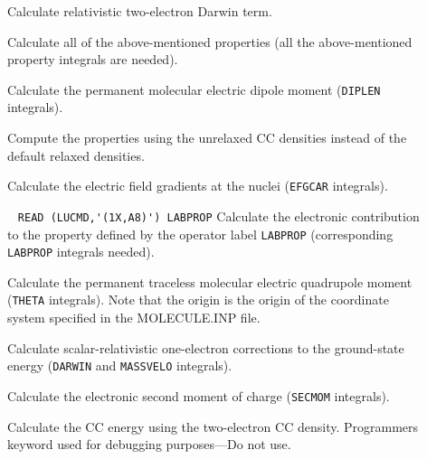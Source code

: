 \begin{description}
\item[] 
        Calculate relativistic two-electron Darwin term.
%
\item[] 
        Calculate all of the above-mentioned properties (all the
        above-mentioned property integrals are needed).
%
\item[] 
        Calculate the permanent molecular electric dipole moment
        (\verb+DIPLEN+ integrals).
%
\item[] 
        Compute the properties using the unrelaxed CC densities instead
        of the default relaxed densities.
%
\item[] 
        Calculate the electric field gradients at the nuclei
        (\verb+EFGCAR+ integrals).
%
\item[] \verb| |\newline
\verb|READ (LUCMD,'(1X,A8)') LABPROP|\newline
        Calculate the electronic contribution to the property defined
        by the operator label \verb+LABPROP+ (corresponding 
        \verb+LABPROP+ integrals needed).
%
\item[] 
        Calculate the permanent traceless molecular electric
        quadrupole moment (\verb+THETA+ integrals). Note that the
        origin is the origin of the coordinate system specified
        in the MOLECULE.INP file.
%
\item[] 
        Calculate scalar-relativistic one-electron
        corrections to the ground-state
        energy (\verb+DARWIN+ and \verb+MASSVELO+ integrals).
%
\item[] 
        Calculate the electronic second moment of charge
        (\verb+SECMOM+ integrals).
%
\item[] 
        Calculate the CC energy using the two-electron CC density.
        Programmers keyword used for debugging purposes---Do not use.
%
\end{description}

